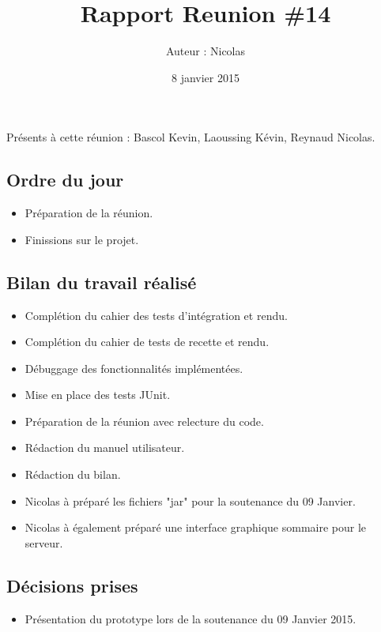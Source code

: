 \documentclass[12pt,a4paper]{article}
\title{Rapport Reunion \#14}
\author{Auteur : Nicolas \bsc{REYNAUD}}
\date{8 janvier 2015}
\begin{document}
\maketitle

\newpage

Présents à cette réunion : Bascol Kevin, Laoussing Kévin, Reynaud Nicolas.

\subsection*{Ordre du jour}
\begin{itemize}[label = $\blacktriangleright$]
\item Préparation de la réunion.
\item Finissions sur le projet.
\end{itemize}

\subsection*{Bilan du travail réalisé}

\begin{itemize}[label = $\blacktriangleright$]
\item Complétion du cahier des tests d'intégration et rendu.

\item Complétion du cahier de tests de recette et rendu.

\item Débuggage des fonctionnalités implémentées.

\item Mise en place des tests JUnit.

\item Préparation de la réunion avec relecture du code.

\item Rédaction du manuel utilisateur.

\item Rédaction du bilan.

\item Nicolas à préparé les fichiers "jar" pour la soutenance du 09 Janvier.

\item Nicolas à également préparé une interface graphique sommaire pour le serveur.

\end{itemize}


\subsection*{Décisions prises}

\begin{itemize}[label = $\blacktriangleright$] 
\item Présentation du prototype lors de la soutenance du 09 Janvier 2015.
\end{itemize}
\end{document}
